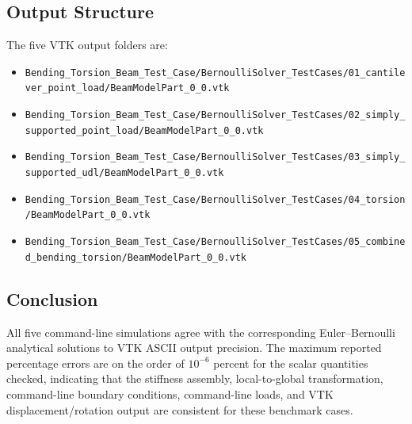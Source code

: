 \documentclass[11pt]{article}
\begin{document}
\subsection*{Output Structure}
The five VTK output folders are:
\begin{itemize}
\item \texttt{Bending\_Torsion\_Beam\_Test\_Case/BernoulliSolver\_TestCases/01\_cantilever\_point\_load/BeamModelPart\_0\_0.vtk}
\item \texttt{Bending\_Torsion\_Beam\_Test\_Case/BernoulliSolver\_TestCases/02\_simply\_supported\_point\_load/BeamModelPart\_0\_0.vtk}
\item \texttt{Bending\_Torsion\_Beam\_Test\_Case/BernoulliSolver\_TestCases/03\_simply\_supported\_udl/BeamModelPart\_0\_0.vtk}
\item \texttt{Bending\_Torsion\_Beam\_Test\_Case/BernoulliSolver\_TestCases/04\_torsion/BeamModelPart\_0\_0.vtk}
\item \texttt{Bending\_Torsion\_Beam\_Test\_Case/BernoulliSolver\_TestCases/05\_combined\_bending\_torsion/BeamModelPart\_0\_0.vtk}

\end{itemize}

\subsection*{Conclusion}
All five command-line simulations agree with the corresponding Euler--Bernoulli analytical solutions to VTK ASCII output precision.  The maximum reported percentage errors are on the order of $10^{-6}$ percent for the scalar quantities checked, indicating that the stiffness assembly, local-to-global transformation, command-line boundary conditions, command-line loads, and VTK displacement/rotation output are consistent for these benchmark cases.
\end{document}
